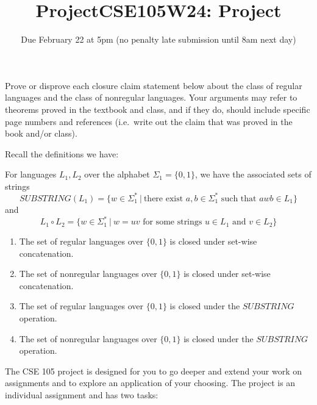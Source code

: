 \begin{enumerate}[wide, labelwidth=!, labelindent=0pt]
Prove or disprove each closure claim statement below about the class of regular languages
and the class of nonregular languages.
Your arguments may refer to theorems proved in the textbook and class, and if they do, should 
include specific page numbers and references (i.e.\ write out the claim that was proved in the book 
and/or class).

Recall the definitions we have: 

For languages $L_1, L_2$ over the alphabet $\Sigma_1 = \{0,1\}$, we have the 
associated sets of strings
\[
   SUBSTRING(L_1) = \{ w \in \Sigma_1^* ~|~ \text{there exist } a,b \in \Sigma_1^* \text{ such that } awb \in L_1\}
\]
and 
\[
   L_1 \circ L_2 = \{ w \in \Sigma_1^* ~|~ w = uv \text{ for some strings } u \in L_1 \text{ and } v \in L_2 \}
\]
\begin{enumerate}

    \item \gradeComplete The set of regular languages over $\{0,1\}$ is closed under set-wise concatenation.

    \item \gradeComplete The set of nonregular languages over $\{0,1\}$ is closed under set-wise concatenation.
 
   \item \gradeComplete The set of regular languages over $\{0,1\}$ is closed under the $SUBSTRING$ operation.

   \item \gradeComplete The set of nonregular languages over $\{0,1\}$ is closed under the $SUBSTRING$ operation.
\end{enumerate}
\end{enumerate}
\newpage
\titleformat{\subsubsection}[runin]
   {\normalfont\bfseries}{}{}{}
   
\title{ProjectCSE105W24: Project}
\date{Due February 22 at 5pm (no penalty late submission until 8am next day)}


\maketitle

\thispagestyle{fancy}


The CSE 105 project is designed for you to go deeper and extend your work on assignments 
and to explore an application of your choosing. 
The project is an individual assignment and has two tasks: 


